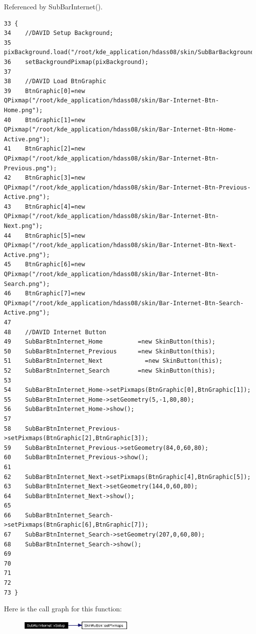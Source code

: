 Referenced by Sub\-Bar\-Internet().



\footnotesize\begin{verbatim}33 {
34    //DAVID Setup Background;
35    pixBackground.load("/root/kde_application/hdass08/skin/SubBarBackground.png");
36    setBackgroundPixmap(pixBackground);
37    
38    //DAVID Load BtnGraphic
39    BtnGraphic[0]=new QPixmap("/root/kde_application/hdass08/skin/Bar-Internet-Btn-Home.png");
40    BtnGraphic[1]=new QPixmap("/root/kde_application/hdass08/skin/Bar-Internet-Btn-Home-Active.png");
41    BtnGraphic[2]=new QPixmap("/root/kde_application/hdass08/skin/Bar-Internet-Btn-Previous.png");
42    BtnGraphic[3]=new QPixmap("/root/kde_application/hdass08/skin/Bar-Internet-Btn-Previous-Active.png");
43    BtnGraphic[4]=new QPixmap("/root/kde_application/hdass08/skin/Bar-Internet-Btn-Next.png");
44    BtnGraphic[5]=new QPixmap("/root/kde_application/hdass08/skin/Bar-Internet-Btn-Next-Active.png");
45    BtnGraphic[6]=new QPixmap("/root/kde_application/hdass08/skin/Bar-Internet-Btn-Search.png");
46    BtnGraphic[7]=new QPixmap("/root/kde_application/hdass08/skin/Bar-Internet-Btn-Search-Active.png");
47    
48    //DAVID Internet Button
49    SubBarBtnInternet_Home          =new SkinButton(this);
50    SubBarBtnInternet_Previous      =new SkinButton(this);
51    SubBarBtnInternet_Next            =new SkinButton(this);
52    SubBarBtnInternet_Search        =new SkinButton(this);
53    
54    SubBarBtnInternet_Home->setPixmaps(BtnGraphic[0],BtnGraphic[1]);
55    SubBarBtnInternet_Home->setGeometry(5,-1,80,80);
56    SubBarBtnInternet_Home->show();
57    
58    SubBarBtnInternet_Previous->setPixmaps(BtnGraphic[2],BtnGraphic[3]);
59    SubBarBtnInternet_Previous->setGeometry(84,0,60,80);
60    SubBarBtnInternet_Previous->show();
61    
62    SubBarBtnInternet_Next->setPixmaps(BtnGraphic[4],BtnGraphic[5]);
63    SubBarBtnInternet_Next->setGeometry(144,0,60,80);
64    SubBarBtnInternet_Next->show();
65    
66    SubBarBtnInternet_Search->setPixmaps(BtnGraphic[6],BtnGraphic[7]);
67    SubBarBtnInternet_Search->setGeometry(207,0,60,80);
68    SubBarBtnInternet_Search->show();
69    
70 
71 
72   
73 }
\end{verbatim}\normalsize 


Here is the call graph for this function:\begin{figure}[H]
\begin{center}
\leavevmode
\includegraphics[width=159pt]{classSubBarInternet_SubBarInterneta2_cgraph}
\end{center}
\end{figure}


